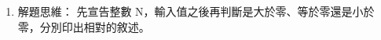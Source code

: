 \begin{enumerate}
\begin{enumerate}
			\item 解題思維：
			\subitem 先宣告整數 N，輸入值之後再判斷是大於零、等於零還是小於零，分別印出相對的敘述。
\begin{comment}			
			
			\item 程式碼：
			\begin{cppcode}
				#include <iostream>
				using namespace std;
				
				int main()
				{
					int n;
					cin >> n;
					if (n>0) cout << "N>0";
					else if (n==0) cout << "N=0";
					else cout << "N<0";
					return 0;
				}
			\end{cppcode}
\end{comment}			
		\end{enumerate}
	
\end{enumerate}



